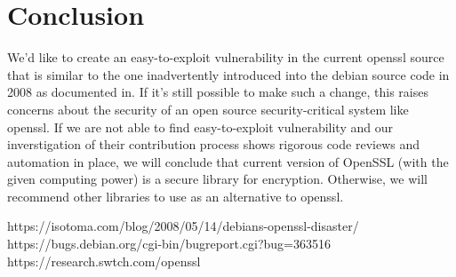 \documentclass[conference]{IEEEtran}
\begin{document}
\section{Conclusion}
We'd like to create an easy-to-exploit vulnerability in the current
openssl source that is similar to the one inadvertently introduced
into the debian source code in 2008 as documented in\cite{1}. If it's still possible to
make such a change, this raises concerns about the security of an open
source security-critical system like openssl.
If we are not able to find easy-to-exploit vulnerability
and our inverstigation of their contribution process
shows rigorous code reviews and automation in place, 
we will conclude that current
version of OpenSSL (with the given computing power) is 
a secure library for encryption. Otherwise, we will
recommend other libraries to use as an alternative
to openssl.

\begin{thebibliography}{00}

 https://isotoma.com/blog/2008/05/14/debians-openssl-disaster/
 https://bugs.debian.org/cgi-bin/bugreport.cgi?bug=363516
 https://research.swtch.com/openssl  
\end{thebibliography}
\end{document}
